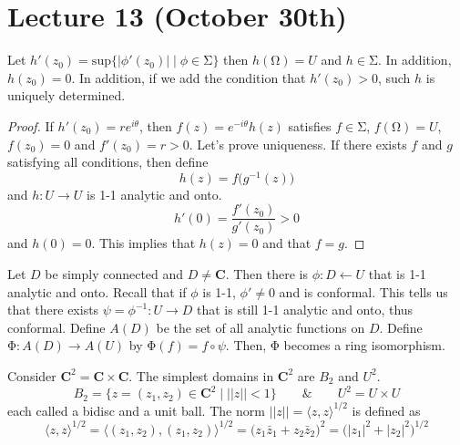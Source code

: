 \section{Lecture 13 (October 30th)}
\begin{thm}
Let $h'(z_0)=\mathrm{sup}\{|\phi '(z_0)|\;|\; \phi \in \mathrm{\Sigma} \}$ then $h(\mathrm{\Omega} )=U$ and $h\in \mathrm{\Sigma} $. In addition, $h(z_0)=0$. In addition, if we add the condition that $h'(z_0)>0$, such $h$ is uniquely determined. 
\end{thm}
\vspace{2ex}
\begin{proof}
If $h'(z_0)=re^{i\theta }$, then $f(z)=e^{-i\theta }h(z)$ satisfies $f\in \mathrm{\Sigma} $, $f(\mathrm{\Omega} )=U$, $f(z_0)=0$ and $f'(z_0)=r>0$. Let's prove uniqueness. If there exists $f$ and $g$ satisfying all conditions, then define
\[h(z)=f\Big(g^{-1}(z)\Big)\]
and $h:U\rightarrow U$ is 1-1 analytic and onto.
\[h'(0)=\dfrac{f'(z_0)}{g'(z_0)}>0\]
and $h(0)=0$. This implies that $h(z)=0$ and that $f=g$. 
\end{proof}
\vspace{2ex}
\begin{thm}
Let $D$ be simply connected and $D\ne {\bm C}$. Then there is $\phi :D\leftarrow U$ that is 1-1 analytic and onto. Recall that if $\phi $ is 1-1, $\phi '\ne 0$ and is conformal. This tells us that there exists $\psi =\phi ^{-1}:U\rightarrow D$ that is still 1-1 analytic and onto, thus conformal. Define $A(D)$ be the set of all analytic functions on $D$. Define $\mathrm{\Phi} :A(D)\rightarrow A(U)$ by $\mathrm{\Phi} (f)=f\circ \psi $. Then, $\mathrm{\Phi} $ becomes a ring isomorphism. 
\end{thm}
\vspace{2ex}
\begin{rmk}
Consider ${\bm C}^2={\bm C}\times {\bm C}$. The simplest domains in ${\bm C}^2$ are $B_{2}$ and $U^2$.
\[B_{2}=\{z=(z_1,z_2)\in {\bm C}^2 \;|\;||z||<1 \}\qquad\&\qquad U^2=U\times U\]
each called a bidisc and a unit ball. The norm $||z||=\langle z,z\rangle ^{1/2}$ is defined as
\[\langle z,z\rangle ^{1/2}=\langle (z_1,z_2),(z_1,z_2)\rangle ^{1/2}=\Big(z_1\bar{z}_{1}+z_{2}\bar{z}_{2}\Big)^2=\Big(|z_1|^2+|z_2|^2\Big)^{1/2}\]
\end{rmk}
\vspace{2ex}
